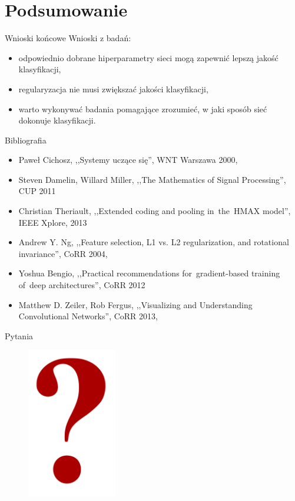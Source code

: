 \documentclass[xcolor=dvipsnames]{beamer}
\begin{document}
\section{Podsumowanie}
\begin{frame}{Wnioski końcowe}
  Wnioski z badań:
  \begin{itemize}
    \item odpowiednio dobrane hiperparametry sieci mogą zapewnić lepszą jakość klasyfikacji,
    \item regularyzacja nie musi zwiększać jakości klasyfikacji,
    \item warto wykonywać badania pomagające zrozumieć, w jaki sposób sieć dokonuje klasyfikacji.
  \end{itemize}
\end{frame}
\begin{frame}{Bibliografia}
	\begin{itemize}
		\item Paweł Cichosz, ,,Systemy uczące się'', WNT Warszawa 2000,
		\item Steven Damelin, Willard Miller, ,,The Mathematics of Signal Processing'', CUP 2011
		\item Christian Theriault, ,,Extended coding and pooling in~the~HMAX model'', IEEE Xplore, 2013
		\item Andrew Y. Ng, ,,Feature selection, L1 vs. L2 regularization, and rotational invariance'', CoRR 2004,
		\item Yoshua Bengio, ,,Practical recommendations for~gradient-based training of~deep architectures'', CoRR 2012
		\item Matthew D. Zeiler, Rob Fergus, ,,Visualizing and Understanding Convolutional Networks'', CoRR 2013,
	\end{itemize}
\end{frame}

\begin{frame}{Pytania}
  \begin{figure}
    \includegraphics[width=0.35\textwidth]{img/question-mark-red.png}
  \end{figure}
\end{frame}
\end{document}
